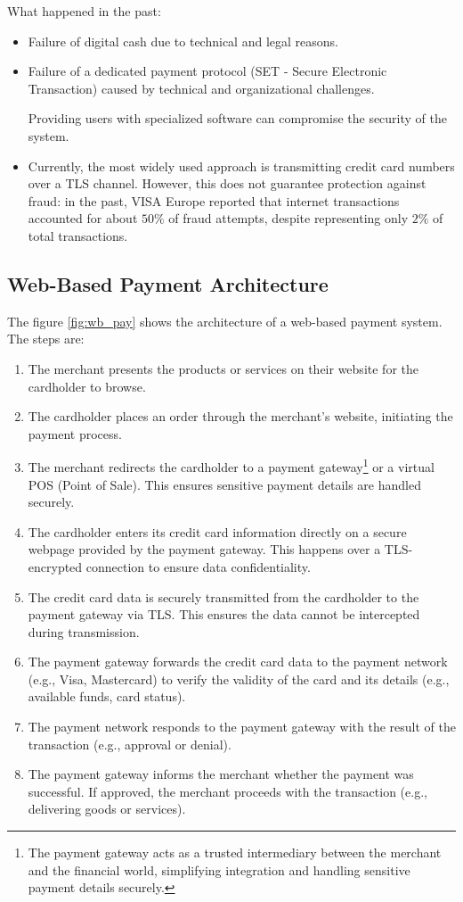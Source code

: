 What happened in the past:
\begin{itemize}
    \item Failure of digital cash due to technical and legal reasons.
    \item Failure of a dedicated payment protocol (SET - Secure Electronic Transaction) caused by technical and organizational challenges.
    \begin{tcolorbox}[colback=red!10!white, colframe=red!70!black, coltitle=white, title=Beware]
    Providing users with specialized software can compromise the security of the system.
    \end{tcolorbox}
    \item Currently, the most widely used approach is transmitting credit card numbers over a TLS channel. However, this does not guarantee protection against fraud: in the past, VISA Europe reported that internet transactions accounted for about $50\%$ of fraud attempts, despite representing only $2\%$ of total transactions.
\end{itemize}

\subsection{Web-Based Payment Architecture}
The figure \ref{fig:wb_pay} shows the architecture of a web-based payment system. The steps are:
\begin{enumerate}
    \item The merchant presents the products or services on their website for the cardholder to browse.
    \item The cardholder places an order through the merchant's website, initiating the payment process.
    \item The merchant redirects the cardholder to a payment gateway\footnote{The payment gateway acts as a trusted intermediary between the merchant and the financial world, simplifying integration and handling sensitive payment details securely.} or a virtual POS (Point of Sale). This ensures sensitive payment details are handled securely.
    \item The cardholder enters its credit card information directly on a secure webpage provided by the payment gateway. This happens over a TLS-encrypted connection to ensure data confidentiality.
    \item The credit card data is securely transmitted from the cardholder to the payment gateway via TLS. This ensures the data cannot be intercepted during transmission.
    \item The payment gateway forwards the credit card data to the payment network (e.g., Visa, Mastercard) to verify the validity of the card and its details (e.g., available funds, card status).
    \item The payment network responds to the payment gateway with the result of the transaction (e.g., approval or denial).
    \item The payment gateway informs the merchant whether the payment was successful. If approved, the merchant proceeds with the transaction (e.g., delivering goods or services).
\end{enumerate}

